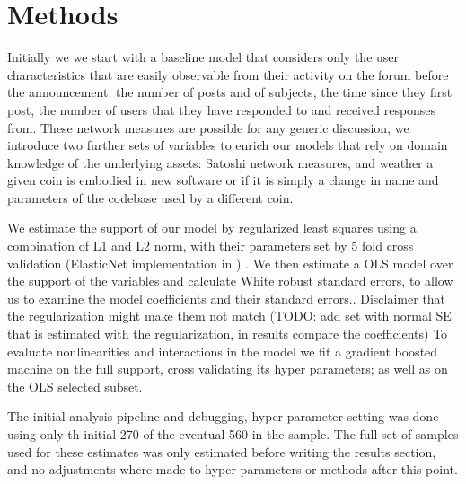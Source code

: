 
\section{Methods }

Initially we we start with a baseline model that considers only the user characteristics that are easily observable from their activity on the forum before the announcement: the number of posts and of subjects,  the time since they first post, the number of users that they have responded to and received responses from. 
These network measures are possible for any generic discussion, we introduce two further sets of variables to enrich our models that rely on domain knowledge of the underlying assets: Satoshi network measures, and weather a given coin is embodied in new software or if it is simply a change in name and parameters of the codebase used by a different coin.

We estimate the support of our model by regularized least squares using a combination of L1 and L2 norm, with their parameters set by 5 fold cross validation  (ElasticNet implementation in \cite{scikit-learn}) . 
We then estimate a OLS model over the support of the variables and calculate White robust standard errors, to allow us to examine the model coefficients and their standard errors.. 
Disclaimer that the regularization might make them not match (TODO: add set with normal SE that is estimated with the regularization, in results compare the coefficients) 
To evaluate nonlinearities and interactions  in the model we fit a gradient boosted machine on the full support, cross validating its hyper parameters; as well as on the OLS selected subset. 

The initial analysis pipeline and debugging, hyper-parameter setting was done using only th initial 270 of the eventual 560 in the sample.
The full set of samples used for these estimates was only estimated before writing the results section, and no adjustments where made to hyper-parameters or methods after this point.
